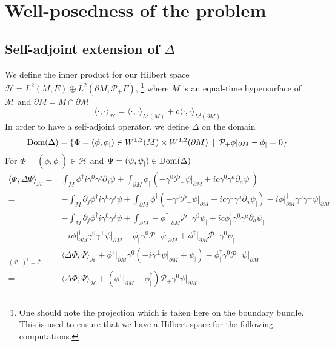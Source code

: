 \section{Well-posedness of the problem}\label{wen-sect-saw}
\subsection{Self-adjoint extension of $\Delta$}
We define the inner product for our Hilbert space $\mathcal{H} = L^{2}(M,E)\oplus L^{2}(\partial M, \mathcal{P}_+ F)$,
\footnote{
One should note the projection which is taken here on the boundary bundle.
This is used to ensure that we have a Hilbert space for the following computations.
}
where $M$ is an equal-time hypersurface of $\mathcal{M}$ and $\partial M = M\cap \partial \mathcal{M}$
\begin{equation}\label{wen-innerpdt}
\langle \cdot, \cdot \rangle _\mathcal{H} = \langle \cdot, \cdot \rangle _{L^2(M)} + c \langle \cdot, \cdot \rangle _{L^2(\partial M)}
\end{equation}
In order to have a self-adjoint operator, we define $\Delta$ on the domain
\begin{equation*}
\mathrm{Dom}( \Delta) = \{ \Phi = (\phi, \phi_|) \in W^{1,2}(M)\times W^{1,2}(
\partial M)\enskip | \enskip \mathcal{P}_+\phi \vert_{\partial M} - \phi_| = 0 \}
\end{equation*}  
For $\Phi = (\phi, \phi_|) \in \mathcal{H}$ and $ \Psi = (\psi, \psi_|)\in\mathrm{Dom}(\Delta)$
\begin{equation}
\begin{split}
\langle \Phi, \Delta \Psi \rangle _\mathcal{H}
 = & \int_M \phi^\dagger i \gamma^0 \gamma^j \partial_j \psi 
+ \int_{\partial M} \phi^\dagger_|(  -\gamma^0\mathcal{P}_- \psi\vert_{\partial M} + ic \gamma^0 \gamma^a \partial_a\psi_|)   \\
 = & - \int_M \partial_j \phi^\dagger i \gamma^0 \gamma^j \psi 
+ \int_{\partial M} \phi^\dagger_|(-\gamma^0 \mathcal{P}_- \psi\vert_{\partial M} + ic \gamma^0 \gamma^a \partial_a  \psi_|) 
- i\phi\vert_{\partial M}^\dagger \gamma^0 \gamma^\bot \psi\vert_{\partial M}   \\
= &
- \int_M \partial_j \phi^\dagger i \gamma^0 \gamma^j \psi 
+ \int_{\partial M} - \phi^\dagger\vert_{\partial M}\mathcal{P}_- \gamma^0 \psi_| + ic \phi^\dagger_|\gamma^0 \gamma^a \partial_a  \psi_|  \\
& - i \phi\vert_{\partial M}^\dagger \gamma^0 \gamma^\bot \psi\vert_{\partial M} 
-\phi_|^\dagger \gamma^0 \mathcal{P}_- \psi\vert_{\partial M} 
+ \phi^\dagger\vert_{\partial M}\mathcal{P}_- \gamma^0 \psi_| \\
\underset{(\mathcal{P}_-)^\dagger = \mathcal{P}_-}{=} 
& \langle \Delta\Phi, \Psi \rangle_\mathcal{H}
+\phi^\dagger\vert_{\partial M} \gamma^0 (-i \gamma^\bot \psi\vert_{\partial M} + \psi_|)
- \phi_|^\dagger \gamma^0 \mathcal{P}_- \psi\vert_{\partial M} \\
= & \langle \Delta\Phi, \Psi \rangle_\mathcal{H}
+ (\phi^\dagger\vert_{\partial M} - \phi_|^\dagger)\mathcal{P}_+ \gamma^0 \psi\vert_{\partial M}
\end{split}
\end{equation}
